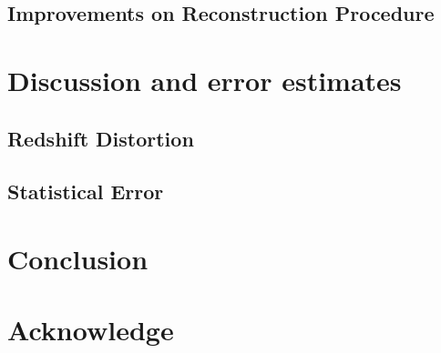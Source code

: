 \documentclass[aps,prd,twocolumn,showpacs,superscriptaddress,groupedaddress,nofootinbib]{revtex4}  %
\begin{document}
\subsection{Improvements on Reconstruction Procedure}

\section{Discussion and error estimates}
\subsection{Redshift Distortion}

\subsection{Statistical Error}

\section{Conclusion}

\section{Acknowledge}



\end{document}
